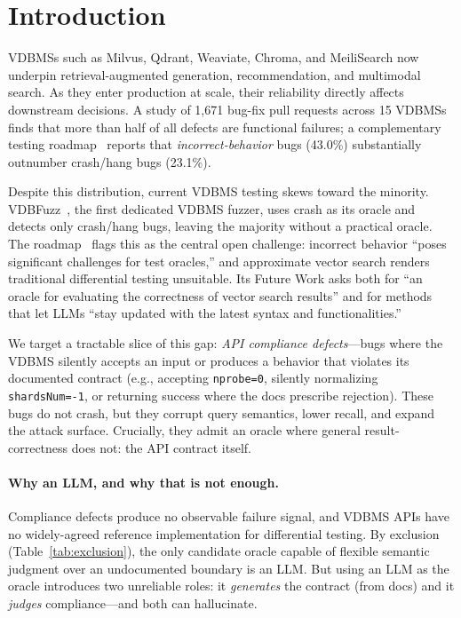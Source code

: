 \documentclass[sigconf]{acmart}
\begin{document}
\maketitle

\section{Introduction}\label{sec:intro}

VDBMSs such as Milvus, Qdrant, Weaviate, Chroma, and MeiliSearch now underpin retrieval-augmented generation, recommendation, and multimodal search. As they enter production at scale, their reliability directly affects downstream decisions. A study of 1{,}671 bug-fix pull requests across 15 VDBMSs~\cite{bugstudy25} finds that more than half of all defects are functional failures; a complementary testing roadmap~\cite{roadmap25} reports that \emph{incorrect-behavior} bugs (43.0\%) substantially outnumber crash/hang bugs (23.1\%).

Despite this distribution, current VDBMS testing skews toward the minority. VDBFuzz~\cite{vdbfuzz26}, the first dedicated VDBMS fuzzer, uses crash as its oracle and detects only crash/hang bugs, leaving the majority without a practical oracle. The roadmap~\cite{roadmap25} flags this as the central open challenge: incorrect behavior ``poses significant challenges for test oracles,'' and approximate vector search renders traditional differential testing unsuitable. Its Future Work asks both for ``an oracle for evaluating the correctness of vector search results'' and for methods that let LLMs ``stay updated with the latest syntax and functionalities.''

We target a tractable slice of this gap: \emph{API compliance defects}---bugs where the VDBMS silently accepts an input or produces a behavior that violates its documented contract (e.g., accepting \texttt{nprobe=0}, silently normalizing \texttt{shardsNum=-1}, or returning success where the docs prescribe rejection). These bugs do not crash, but they corrupt query semantics, lower recall, and expand the attack surface. Crucially, they admit an oracle where general result-correctness does not: the API contract itself.

\paragraph{Why an LLM, and why that is not enough.}
Compliance defects produce no observable failure signal, and VDBMS APIs have no widely-agreed reference implementation for differential testing. By exclusion (Table~\ref{tab:exclusion}), the only candidate oracle capable of flexible semantic judgment over an undocumented boundary is an LLM. But using an LLM as the oracle introduces two unreliable roles: it \emph{generates} the contract (from docs) and it \emph{judges} compliance---and both can hallucinate.
\end{document}
